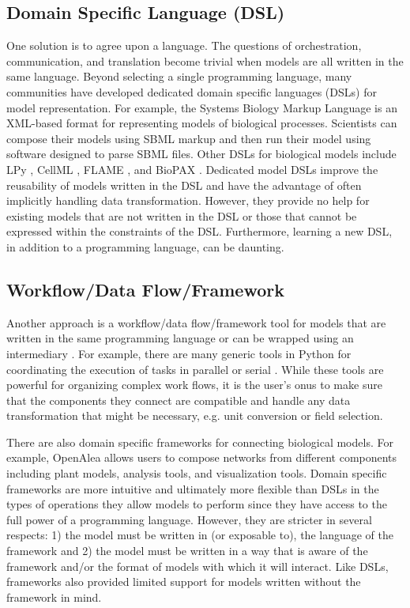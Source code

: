 \documentclass[journal]{IEEEtran}
\begin{document}
\subsection{Domain Specific Language (DSL)}\label{SS:dsl}
%
One solution is to agree upon a language. The questions of orchestration, communication, and translation become trivial when models are all written in the same language. Beyond selecting a single programming language, many communities have  developed dedicated domain specific languages (DSLs) for model representation. For example, the Systems Biology Markup Language \citep[SBML][]{Hucka2003} is an XML-based format for representing models of biological processes. Scientists can compose their models using SBML markup and then run their model using software designed to parse SBML files. Other DSLs for biological models include LPy \citep{Boudon2012}, CellML \citep{Cuellar2003}, FLAME \citep{Coakley2012}, and BioPAX \citep{Demir2010}. Dedicated model DSLs improve the reusability of models written in the DSL and have the advantage of often implicitly handling data transformation. However, they provide no help for existing models that are not written in the DSL or those that cannot be expressed within the constraints of the DSL. Furthermore, learning a new DSL, in addition to a programming language, can be daunting.

\subsection{Workflow/Data Flow/Framework}\label{SS:framework}
%
Another approach is a workflow/data flow/framework tool for models that are written in the same programming language or can be wrapped using an intermediary \citep[e.g. Cython, ][]{Behnel2011a}. For example, there are many generic tools in Python for coordinating the execution of tasks in parallel or serial \citep[e.g.][]{babuji18, celery, luigi}. While these tools are powerful for organizing complex work flows, it is the user's onus to make sure that the components they connect are compatible and handle any data transformation that might be necessary, e.g. unit conversion or field selection.

There are also domain specific frameworks for connecting biological models. For example, OpenAlea \citep{Pradal2015} allows users to compose networks from different components including plant models, analysis tools, and visualization tools. Domain specific frameworks are more intuitive and ultimately more flexible than DSLs in the types of operations they allow models to perform since they have access to the full power of a programming language. However, they are stricter in several respects: 1) the model must be written in (or exposable to), the language of the framework and 2) the model must be written in a way that is aware of the framework and/or the format of models with which it will interact. Like DSLs, frameworks also provided limited support for models written without the framework in mind. 
\end{document}
